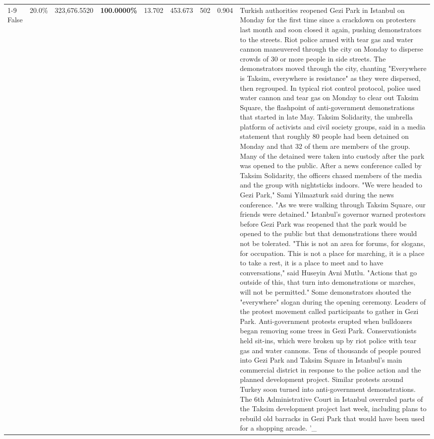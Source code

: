 \begin{table}[H]
\begin{tabular}{lllrlllll}
\cline{1-9}
False & 20.0\% & 323,676.5520 & \bfseries \color{red} 100.0000\% & 13.702 & 453.673 & 502 & 0.904 & Turkish authorities reopened Gezi Park in Istanbul on Monday for the first time since a crackdown on protesters last month and soon closed it again, pushing demonstrators to the streets. Riot police armed with tear gas and water cannon maneuvered through the city on Monday to disperse crowds of 30 or more people in side streets. The demonstrators moved through the city, chanting "Everywhere is Taksim, everywhere is resistance" as they were dispersed, then regrouped. In typical riot control protocol, police used water cannon and tear gas on Monday to clear out Taksim Square, the flashpoint of anti-government demonstrations that started in late May. Taksim Solidarity, the umbrella platform of activists and civil society groups, said in a media statement that roughly 80 people had been detained on Monday and that 32 of them are members of the group. Many of the detained were taken into custody after the park was opened to the public. After a news conference called by Taksim Solidarity, the officers chased members of the media and the group with nightsticks indoors. "We were headed to Gezi Park," Sami Yilmazturk said during the news conference. "As we were walking through Taksim Square, our friends were detained." Istanbul's governor warned protestors before Gezi Park was reopened that the park would be opened to the public but that demonstrations there would not be tolerated. "This is not an area for forums, for slogans, for occupation. This is not a place for marching, it is a place to take a rest, it is a place to meet and to have conversations," said Huseyin Avni Mutlu. "Actions that go outside of this, that turn into demonstrations or marches, will not be permitted." Some demonstrators shouted the "everywhere" slogan during the opening ceremony. Leaders of the protest movement called participants to gather in Gezi Park. Anti-government protests erupted when bulldozers began removing some trees in Gezi Park. Conservationists held sit-ins, which were broken up by riot police with tear gas and water cannons. Tens of thousands of people poured into Gezi Park and Taksim Square in Istanbul's main commercial district in response to the police action and the planned development project. Similar protests around Turkey soon turned into anti-government demonstrations. The 6th Administrative Court in Istanbul overruled parts of the Taksim development project last week, including plans to rebuild old barracks in Gezi Park that would have been used for a shopping arcade. '\_ \\

\end{tabular}
\end{table}
